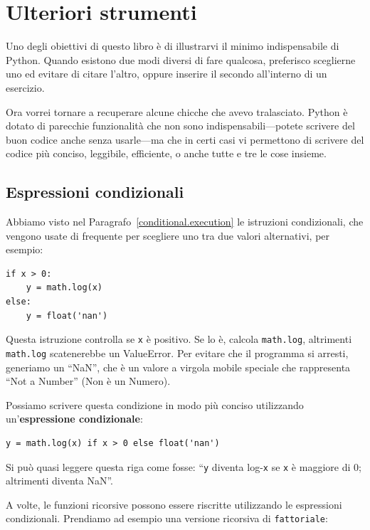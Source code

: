 \documentclass[10pt]{book}
\begin{document}
\chapter{Ulteriori strumenti}

Uno degli obiettivi di questo libro è di illustrarvi il minimo indispensabile di Python. Quando esistono due modi diversi di fare qualcosa, preferisco sceglierne uno ed evitare di citare l'altro, oppure inserire il secondo all'interno di un esercizio.

Ora vorrei tornare a recuperare alcune chicche che avevo tralasciato. Python è dotato di parecchie funzionalità che non sono indispensabili---potete scrivere del buon codice anche senza usarle---ma che in certi casi vi permettono di scrivere del codice più conciso, leggibile, efficiente, o anche tutte e tre le cose insieme.


\section{Espressioni condizionali}

Abbiamo visto nel Paragrafo~\ref{conditional.execution} le istruzioni condizionali, che vengono usate di frequente per scegliere uno tra due valori alternativi, per esempio:

\begin{verbatim}
if x > 0:
    y = math.log(x)
else:
    y = float('nan')
\end{verbatim}

Questa istruzione controlla se {\tt x} è positivo. Se lo è, calcola
{\tt math.log}, altrimenti {\tt math.log} scatenerebbe un ValueError.  Per evitare che il programma si arresti, generiamo un ``NaN'', che è un valore a virgola mobile speciale che rappresenta ``Not a Number'' (Non è un Numero).

Possiamo scrivere questa condizione in modo più conciso utilizzando un'{\bf espressione condizionale}:

\begin{verbatim}
y = math.log(x) if x > 0 else float('nan')
\end{verbatim}

Si può quasi leggere questa riga come fosse: ``{\tt y} diventa log-{\tt x}
se {\tt x} è maggiore di 0; altrimenti diventa NaN''.

A volte, le funzioni ricorsive possono essere riscritte utilizzando le espressioni  condizionali. Prendiamo ad esempio una versione ricorsiva di {\tt fattoriale}:
\end{document}
